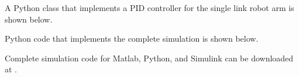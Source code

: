 A Python class that implements a PID controller for the single link robot arm is shown below.


Python code that implements the complete simulation is shown below.


Complete simulation code for Matlab, Python, and Simulink can be downloaded at .


%
%
%
